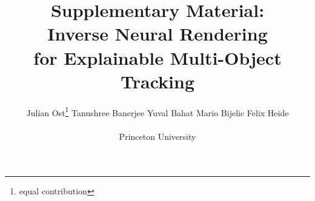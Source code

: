\documentclass[runningheads]{llncs}
\begin{document}
\title{Supplementary Material: \\ Inverse Neural Rendering\\ for Explainable Multi-Object Tracking} 

\author{Julian Ost\thanks{equal contribution} %
\qquad
Tanushree Banerjee\footnotemark[1] %
\qquad
Yuval Bahat
\qquad
Mario Bijelic
\qquad
Felix Heide
\\ \\ Princeton University
}


\maketitle
\end{document}
